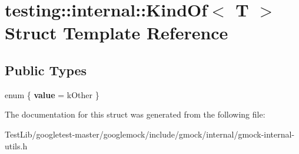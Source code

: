 \hypertarget{structtesting_1_1internal_1_1KindOf}{}\section{testing\+:\+:internal\+:\+:Kind\+Of$<$ T $>$ Struct Template Reference}
\label{structtesting_1_1internal_1_1KindOf}
\subsection*{Public Types}
\begin{DoxyCompactItemize}
\item 
\mbox{\label{structtesting_1_1internal_1_1KindOf_a4866389a4bc8d5522b5f8ae61a42f520}} 
enum \{ {\bfseries value} = k\+Other
 \}
\end{DoxyCompactItemize}


The documentation for this struct was generated from the following file\+:\begin{DoxyCompactItemize}
\item 
Test\+Lib/googletest-\/master/googlemock/include/gmock/internal/gmock-\/internal-\/utils.\+h\end{DoxyCompactItemize}
